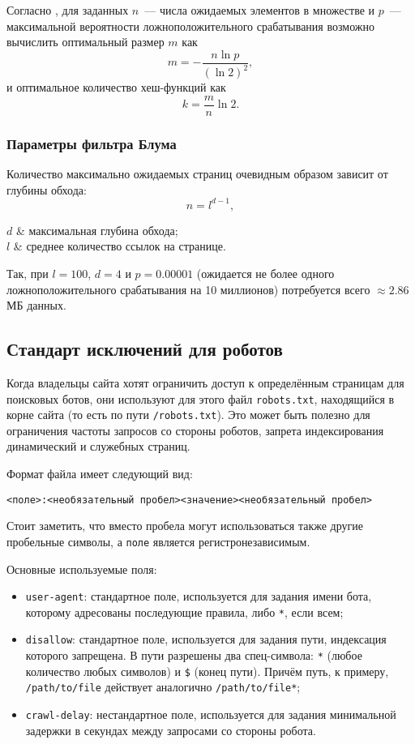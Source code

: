 Согласно \cite{broder02}, для заданных $n$~--- числа ожидаемых элементов в множестве и $p$~--- максимальной вероятности ложноположительного срабатывания возможно вычислить оптимальный размер $m$ как
\begin{equation}
  m=-\frac{n\ln p}{(\ln 2)^2},
\end{equation}
и оптимальное количество хеш-функций как
\begin{equation}
  k=\frac{m}{n}\ln 2.
\end{equation}


\subsubsection{Параметры фильтра Блума}
Количество максимально ожидаемых страниц очевидным образом зависит от глубины обхода:
\begin{equation}
  n=l^{d-1},
\end{equation}
\begin{conditions}
  $d$ & максимальная глубина обхода;\\
  $l$ & среднее количество ссылок на странице.
\end{conditions}

Так, при $l=100$, $d=4$ и $p=0.00001$ (ожидается не более одного ложноположительного срабатывания на 10 миллионов) потребуется всего $\approx 2.86$МБ данных.


\subsection{Стандарт исключений для роботов} \label{ssec:robotstxt}
Когда владельцы сайта хотят ограничить доступ к определённым страницам для поисковых ботов, они используют для этого файл \verb|robots.txt|, находящийся в корне сайта (то есть по пути \verb|/robots.txt|). Это может быть полезно для ограничения частоты запросов со стороны роботов, запрета индексирования динамический и служебных страниц.

Формат файла имеет следующий вид:
\begin{verbatim}
<поле>:<необязательный пробел><значение><необязательный пробел>
\end{verbatim}

Стоит заметить, что вместо пробела могут использоваться также другие пробельные символы, а \verb|поле| является регистронезависимым.

Основные используемые поля:
\begin{itemize}
  \item \verb|user-agent|: стандартное поле, используется для задания имени бота, которому адресованы последующие правила, либо \verb|*|, если всем;
  \item \verb|disallow|: стандартное поле, используется для задания пути, индексация которого запрещена. В пути разрешены два спец-символа: \verb|*| (любое количество любых символов) и \verb|$| (конец пути). Причём путь, к примеру, \verb|/path/to/file| действует аналогично \verb|/path/to/file*|;
  \item \verb|crawl-delay|: нестандартное поле, используется для задания минимальной задержки в секундах между запросами со стороны робота.
\end{itemize}


